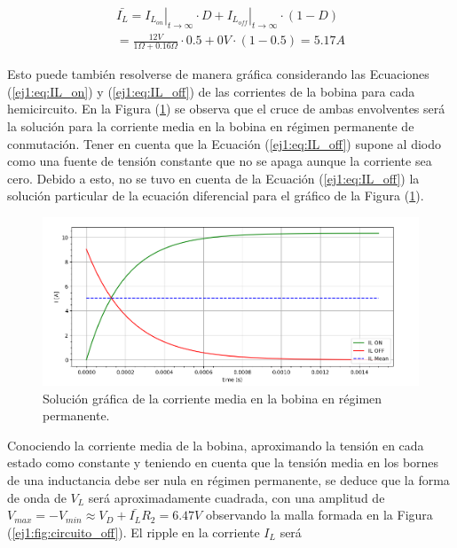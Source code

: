 \begin{equation}
\begin{gathered}
	\bar{I_L} = \left. I_{L_{on}}\right|_{t \rightarrow \infty} \cdot D + \left. I_{L_{off}}\right|_{t \rightarrow \infty} \cdot (1-D) \\ = \frac{12V}{1\Omega + 0.16\Omega} \cdot 0.5 + 0V \cdot (1-0.5) = 5.17A
\end{gathered}
\label{ej1:eq:ilbar}
\end{equation}

Esto puede también resolverse de manera gráfica considerando las Ecuaciones (\ref{ej1:eq:IL_on}) y (\ref{ej1:eq:IL_off}) de las corrientes de la bobina para cada hemicircuito. En la Figura (\ref{ej1:fig:ILmediagrafico}) se observa que el cruce de ambas envolventes será la solución para la corriente media en la bobina en régimen permanente de conmutación. Tener en cuenta que la Ecuación (\ref{ej1:eq:IL_off}) supone al diodo como una fuente de tensión constante que no se apaga aunque la corriente sea cero. Debido a esto, no se tuvo en cuenta de la Ecuación (\ref{ej1:eq:IL_off}) la solución particular de la ecuación diferencial para el gráfico de la Figura (\ref{ej1:fig:ILmediagrafico}).

\begin{figure}[H]
	\centering
	\includegraphics[width=0.8\linewidth]{ImagenesEjercicio-1/solgraficaIL}
	\caption{Solución gráfica de la corriente media en la bobina en régimen permanente.}
	\label{ej1:fig:ILmediagrafico}
\end{figure}

Conociendo la corriente media de la bobina, aproximando la tensión en cada estado como constante y teniendo en cuenta que la tensión media en los bornes de una inductancia debe ser nula en régimen permanente, se deduce que la forma de onda de $V_L$ será aproximadamente cuadrada, con una amplitud de $V_{max} = -V_{min} \approx V_D + \bar{I_L}R_2 = 6.47V$ observando la malla formada en la Figura (\ref{ej1:fig:circuito_off}). El ripple en la corriente $I_L$ será 

